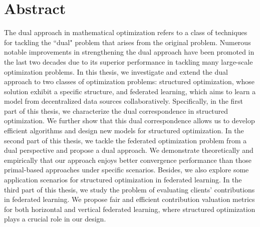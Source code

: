 
\chapter{Abstract}

The dual approach in mathematical optimization refers to a class of techniques for tackling the ``dual" problem that arises from the original problem. Numerous notable improvements in strengthening the dual approach have been promoted in the last two decades due to its superior performance in tackling many large-scale optimization problems. In this thesis, we investigate and extend the dual approach to two classes of optimization problems: structured optimization, whose solution exhibit a specific structure, and federated learning, which aims to learn a model from decentralized data sources collaboratively. Specifically, in the first part of this thesis, we characterize the dual correspondence in structured optimization. We further show that this dual correspondence allows us to develop efficient algorithms and design new models for structured optimization. In the second part of this thesis, we tackle the federated optimization problem from a dual perspective and propose a dual approach. We demonstrate theoretically and empirically that our approach enjoys better convergence performance than those primal-based approaches under specific scenarios. Besides, we also explore some application scenarios for structured optimization in federated learning. In the third part of this thesis, we study the problem of evaluating clients' contributions in federated learning. We propose fair and efficient contribution valuation metrics for both horizontal and vertical federated learning, where structured optimization plays a crucial role in our design. 








